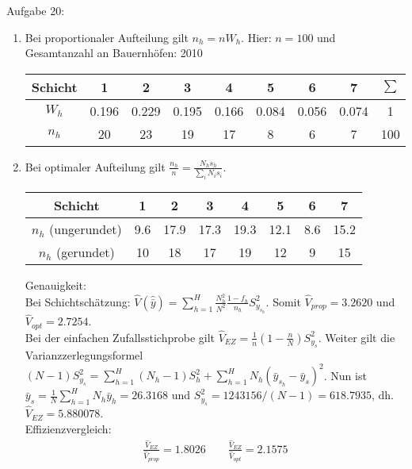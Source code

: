 \begin{Solution}{{Aufgabe 20:}}
\begin{enumerate}
	\item Bei proportionaler Aufteilung gilt $n_h = n W_h$. Hier: $n=100$ und Gesamtanzahl an Bauernhöfen: 2010
	\begin{center}
	\begin{tabular}{|c|c|c|c|c|c|c|c|c|}
		\hline
		Schicht & 1 & 2 & 3 & 4 & 5 & 6 & 7 & $\sum$ \\
		\hline
		$W_h$ & 0.196 & 0.229 & 0.195 & 0.166 & 0.084 & 0.056 & 0.074 & 1 \\
		\hline
		$n_h$ & 20 & 23 & 19 & 17 & 8 & 6 & 7 & 100 \\
		\hline
	\end{tabular}
	\end{center}
	\item Bei optimaler Aufteilung gilt $\frac{n_h}{n} = \frac{N_h s_h}{\sum_i N_i s_i}$.
\begin{center}
	\begin{tabular}{|c|c|c|c|c|c|c|c|}
		\hline
		Schicht & 1 & 2 & 3 & 4 & 5 & 6 & 7\\
		\hline
		$n_h$ (ungerundet)	& 9.6 & 17.9 & 17.3 & 19.3 & 12.1 & 8.6 & 15.2\\
		\hline
		$n_h$ (gerundet) & 10 & 18 & 17 & 19 & 12 & 9 & 15\\
		\hline
	\end{tabular}
\end{center}
Genauigkeit:\\
Bei Schichtschätzung: $\hat{V}(\hat{\bar{y}}) = \sum_{h=1}^H \frac{N_h^2}{N^2}\frac{1-f_h}{n_h}S_{y_{s_h}}^2$. Somit
$\hat{V}_{prop}=3.2620$ und $\hat{V}_{opt} = 2.7254$.\\
Bei der einfachen Zufallsstichprobe gilt $\hat{V}_{EZ} = \frac{1}{n}\left(1-\frac{n}{N}\right) S_{y_s}^2$. Weiter gilt die Varianzzerlegungsformel $(N-1)S_{y_s}^2 = \sum_{h=1}^H (N_h-1)S_h^2 + \sum_{h=1}^H N_h (\bar{y}_{s_h}-\bar{y}_s)^2$. Nun ist $\bar{y}_s=\frac{1}{N}\sum_{h=1}^H N_h \bar{y}_h = 26.3168$ und $S_{y_s}^2 = 1243156/(N-1) = 618.7935$, dh. $\hat{V}_{EZ} = 5.880078$.\\
Effizienzvergleich:
\begin{align*}
\frac{\hat{V}_{EZ}}{\hat{V}_{prop}} = 1.8026 \qquad
\frac{\hat{V}_{EZ}}{\hat{V}_{opt}} = 2.1575
\end{align*}

\end{enumerate}
\end{Solution}

